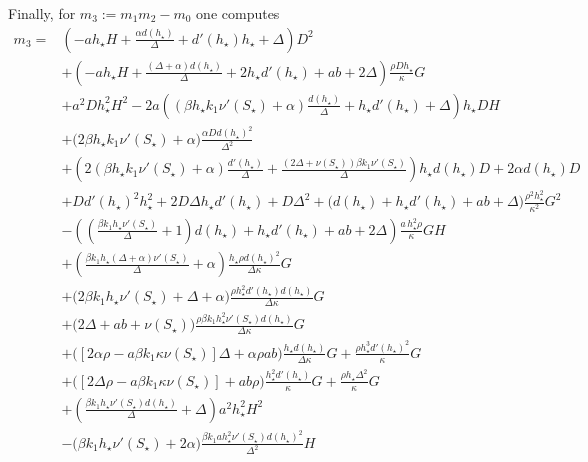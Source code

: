 \documentclass[reqno,11pt]{amsart}
\numberwithin{equation}{section}
\begin{document}
\begin{appendix}
 Finally,  for $m_3:=m_1m_2-m_0$ one computes
\begin{align*}
m_3=&\left(-a h_\star H+\frac{\alpha d(h_\star) }{\Delta}+d'(h_\star)  h_\star +\Delta\right) D^{2}\\
&+\left(-a h_\star H+\frac{(\Delta+  \alpha)  d(h_\star) }{\Delta }+2 h_\star  d'(h_\star) + ab +2    \Delta\right)\frac{\rho D h_\star }{\kappa}G\\
&+ a^{2}D h_\star^{2} H^{2}-2a\left(\left(\beta h_\star k_1    \nu'(S_\star)+ \alpha  \right) \frac{d(h_\star)}{\Delta} + h_\star  d'(h_\star)  + \Delta \right)h_\star D H\\
&+\Big(2 \beta  h_\star k_1   \nu'(S_\star)+\alpha\Big)\frac{\alpha D d(h_\star)^{2}}{\Delta^{2}}\\
& +\left(2\left(\beta h_\star k_1   \nu'(S_\star)+ \alpha\right) \frac{d'(h_\star)}{\Delta} +\frac{(2     \Delta+   \nu(S_\star) ) \beta k_1  \nu'(S_\star)}{\Delta}\right)  h_\star d(h_\star)D+2 \alpha  d(h_\star) D\\
& +D d'(h_\star)^{2} h_\star^{2}+2 D\Delta h_\star d'(h_\star) +D\Delta^{2}+\Big(d(h_\star) +h_\star  d'(h_\star) +ab+ \Delta\Big) \frac{\rho^{2} h_\star^2}{\kappa^{2}} G^{2}\\
&-\left(\left(\frac{\beta k_1  h_\star   \nu'(S_\star)}{\Delta}+1\right) d(h_\star) +h_\star  d'(h_\star) +ab +2 \Delta\right) \frac{a \,h_\star^{2} \rho}{\kappa} G H\\
&+\left(\frac{\beta k_1 h_\star\left( \Delta+\alpha\right)  \nu'(S_\star)}{\Delta}+\alpha\right) \frac{h_\star  \rho d(h_\star)^{2}}{\Delta \kappa } G\\
&+\Big(2 \beta k_1 h_\star   \nu'(S_\star)+ \Delta+ \alpha\Big) \frac{   \rho  h_\star^{2} d'(h_\star)d(h_\star)}{\Delta \kappa}G \\
&+\Big(2  \Delta+ab+  \nu(S_\star)\Big)  \frac{\rho \beta k_1 h_\star^2\nu'(S_\star)d(h_\star)}{\Delta \kappa} G\\
&+\Big( \left[2\alpha\rho-a\beta k_1 \kappa\nu(S_\star)\right] \Delta +\alpha\rho ab\Big) \frac{h_\star d(h_\star)}{\Delta \kappa} G+ \frac{\rho h_\star^{3}  d'(h_\star)^{2}}{\kappa}G\\
 & +\Big( \left[2\Delta\rho-a\beta k_1 \kappa\nu(S_\star)\right] +ab \rho\Big) \frac{h_\star^2 d'(h_\star) }{ \kappa}  G
+\frac{\rho  h_\star\Delta^{2}}{\kappa} G\\
&+\left(\frac{ \beta  k_1  h_\star  \nu'(S_\star) d(h_\star) }{\Delta}+\Delta\right) a^{2}h_\star^{2}   H^{2}\\
&-\Big(\beta k_1 h_\star \nu'(S_\star) +2\alpha\Big) \frac{\beta  k_1 a h_\star^{2}  \nu'(S_\star)d(h_\star) ^{2}}{\Delta^{2}} H\\

\end{align*}
\end{appendix}
\end{document}
